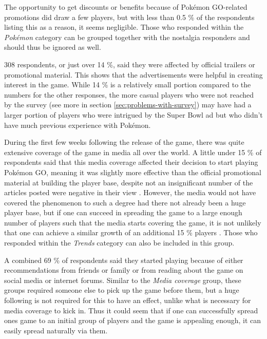 The opportunity to get discounts or benefits because of Pokémon GO-related promotions did draw a few players, but with less than 0.5 \% of the respondents listing this as a reason, it seems negligible. Those who responded within the \emph{Pokémon} category can be grouped together with the nostalgia responders and should thus be ignored as well.

308 respondents, or just over 14 \%, said they were affected by official trailers or promotional material. This shows that the advertisements  were helpful in creating interest in the game. While 14 \% is a relatively small portion compared to the numbers for the other responses, the more casual players who were not reached by the survey (see more in section \ref{sec:problems-with-survey}) may have had a larger portion of players who were intrigued by the Super Bowl ad but who didn't have much previous experience with Pokémon. 

During the first few weeks following the release of the game, there was quite extensive coverage of the game in media all over the world. A little under 15 \% of respondents said that this media coverage affected their decision to start playing Pokémon GO, meaning it was slightly more effective than the official promotional material at building the player base, despite not an insignificant number of the articles posted were negative in their view . However, the media would not have covered the phenomenon to such a degree had there not already been a huge player base, but if one can succeed in spreading the game to a large enough number of players such that the media starts covering the game, it is not unlikely that one can achieve a similar growth of an additional 15 \% players . Those who responded within the \emph{Trends} category can also be included in this group.

A combined 69 \% of respondents said they started playing because of either recommendations from friends or family or from reading about the game on social media or internet forums. Similar to the \emph{Media coverage} group, these groups required someone else to pick up the game before them, but a huge following is not required for this to have an effect, unlike what is necessary for media coverage to kick in. Thus it could seem that if one can successfully spread ones game to an initial group of players and the game is appealing enough, it can easily spread naturally via them.

